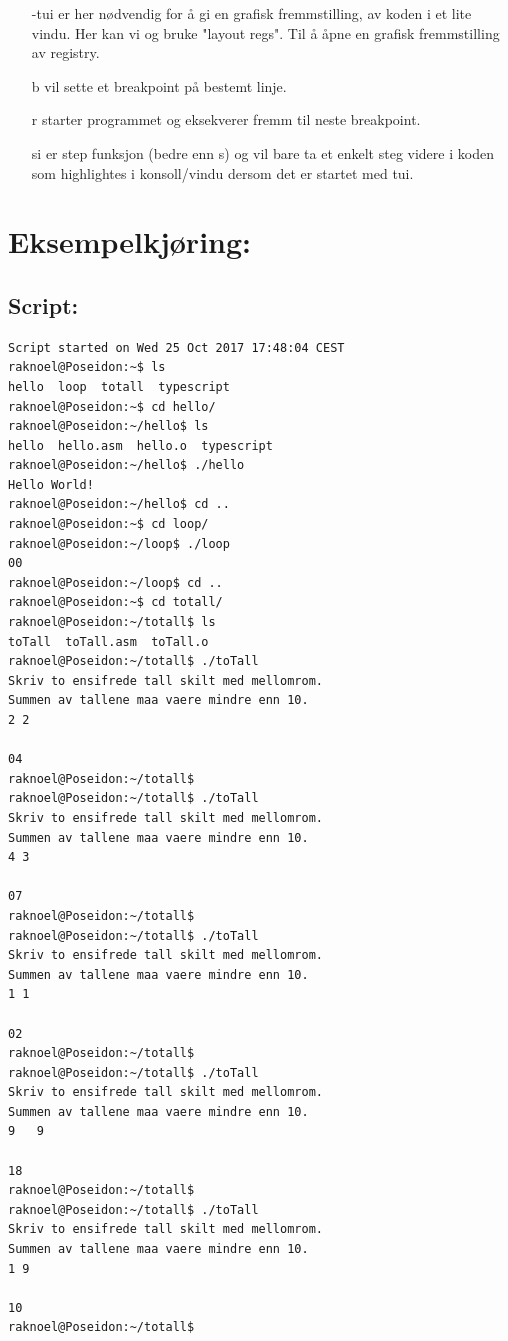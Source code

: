 \documentclass[norsk, a4paper, 12pt,]{article}
\begin{document}
\begin{itemize}
  \item [-tui] er her nødvendig for å gi en grafisk fremmstilling, av koden i et
  lite vindu. Her kan vi og bruke "layout regs". Til å åpne en grafisk
  fremmstilling av registry.

  \item [b] vil sette et breakpoint på bestemt linje.

  \item [r] starter programmet og eksekverer fremm til neste breakpoint.

  \item [si] er step funksjon (bedre enn s) og vil bare ta et enkelt steg videre i koden
  som highlightes i konsoll/vindu dersom det er startet med \-tui.
\end{itemize}

\section*{Eksempelkjøring:}
\subsection{Script:}
\begin{verbatim}
Script started on Wed 25 Oct 2017 17:48:04 CEST
raknoel@Poseidon:~$ ls
hello  loop  totall  typescript
raknoel@Poseidon:~$ cd hello/
raknoel@Poseidon:~/hello$ ls
hello  hello.asm  hello.o  typescript
raknoel@Poseidon:~/hello$ ./hello
Hello World!
raknoel@Poseidon:~/hello$ cd ..
raknoel@Poseidon:~$ cd loop/
raknoel@Poseidon:~/loop$ ./loop
00
raknoel@Poseidon:~/loop$ cd ..
raknoel@Poseidon:~$ cd totall/
raknoel@Poseidon:~/totall$ ls
toTall  toTall.asm  toTall.o
raknoel@Poseidon:~/totall$ ./toTall
Skriv to ensifrede tall skilt med mellomrom.
Summen av tallene maa vaere mindre enn 10.
2 2

04
raknoel@Poseidon:~/totall$
raknoel@Poseidon:~/totall$ ./toTall
Skriv to ensifrede tall skilt med mellomrom.
Summen av tallene maa vaere mindre enn 10.
4 3

07
raknoel@Poseidon:~/totall$
raknoel@Poseidon:~/totall$ ./toTall
Skriv to ensifrede tall skilt med mellomrom.
Summen av tallene maa vaere mindre enn 10.
1 1

02
raknoel@Poseidon:~/totall$
raknoel@Poseidon:~/totall$ ./toTall
Skriv to ensifrede tall skilt med mellomrom.
Summen av tallene maa vaere mindre enn 10.
9   9

18
raknoel@Poseidon:~/totall$
raknoel@Poseidon:~/totall$ ./toTall
Skriv to ensifrede tall skilt med mellomrom.
Summen av tallene maa vaere mindre enn 10.
1 9

10
raknoel@Poseidon:~/totall$
\end{verbatim}
\end{document}

